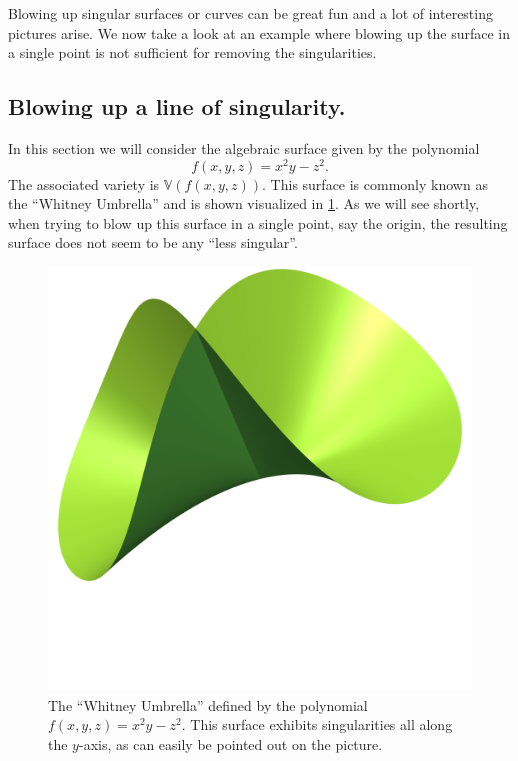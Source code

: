 \documentclass{article}
\newcommand{\V}{\ensuremath{\mathbb{V}}}
\begin{document}
    Blowing up singular surfaces or curves can be great fun and a lot of
    interesting pictures arise. We now take a look at an example where blowing
    up the surface in a single point is not sufficient for removing the
    singularities. 
    
    \subsection{Blowing up a line of singularity.}
    \label{sub:blowing_up_a_line_of_singularity_}
    
    In this section we will consider the algebraic surface given by the
    polynomial 
    \begin{equation}
        \label{eq:whitney}
        f(x, y, z) = x^2y - z^2.
    \end{equation}
    The associated variety is $\V(f(x, y, z))$. This surface is commonly known
    as the ``Whitney Umbrella'' and is shown visualized in
    \cref{fig:whitney_umbrella}. As we will see shortly, when trying to blow up
    this surface in a single point, say the origin, the resulting surface does
    not seem to be any ``less singular''.
   
    \begin{figure}[h]
        \centering
        \includegraphics[width=0.4\linewidth]{pictures/blowup_line.png}
        \caption{The ``Whitney Umbrella'' defined by the polynomial $f(x, y, z)
        = x^2y - z^2$. This surface exhibits singularities all along the
        $y$-axis, as can easily be pointed out on the picture.}
        \label{fig:whitney_umbrella}
    \end{figure}
\end{document}
